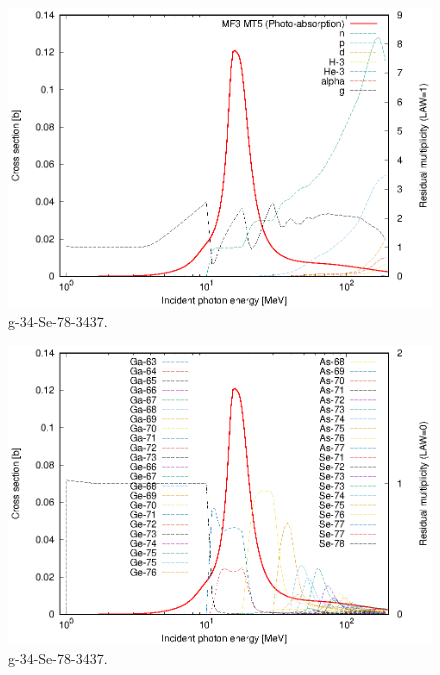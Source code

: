 \begin{figure}
 \includegraphics[width=\linewidth]{eps/g_34-Se-78_3437.eps}
  \caption{g-34-Se-78-3437.}
\end{figure}
\begin{figure}
 \includegraphics[width=\linewidth]{eps-law0/g_34-Se-78_3437.eps}
 \caption{g-34-Se-78-3437.}
\end{figure}
\newpage \clearpage

